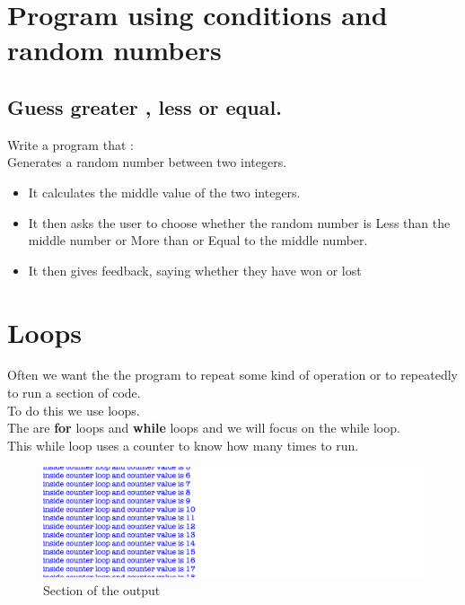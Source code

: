 \documentclass[a4paper,12pt]{article}
\begin{document}
\section{Program using conditions and random numbers}
\subsection{Guess greater , less or equal.}

Write a program that :\\
Generates a random number between two integers.
\begin{itemize}
	\item It calculates the middle value of the two integers.
	\item It then asks the user to choose whether the random  number is Less than the middle number or More than or Equal to the middle number.
	\item It then gives feedback, saying whether they have won or lost
\end{itemize}


\newpage
\section{Loops}
Often we want the the program to repeat some kind of operation or to repeatedly to run a section of code.\\
To do this we use loops.\\
The are \textbf{for} loops and \textbf{while} loops and we will focus on the while loop.\\

This while loop uses a counter to know how many times to run.

 \begin{figure} [!h]
	\centering
	\includegraphics[width=17cm]{screen_shots/loop_counter.png}
	\caption*{Section of the output}
\end{figure}
\end{document}
